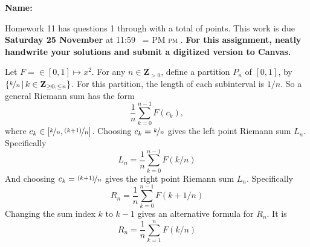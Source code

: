 \documentclass[12pt,fleqn,answers]{exam}
\makeatletter
\newcommand{\integers}{\mathbf{Z}}
\newcommand{\quiz}{11}
\newcommand{\term}{Fall}
\DeclareRobustCommand{\maybefakesc}[1]{%
  \ifnum\pdfstrcmp{\f@series}{\bfdefault}=\z@
    {\fontsize{\dimexpr0.8\dimexpr\f@size pt\relax}{0}\selectfont\uppercase{#1}}%
  \else
    \textsc{#1}%
  \fi
}
\newcommand\PM{\,\maybefakesc{pm}\xspace}
\makeatother
\begin{document}
\large
\vspace{0.1in}
\noindent{}
{\bf Name:}  \\
\noindent \makebox[3.0truein][l]{\textbf{Homework \quiz, \term \/ \the\year}}
\vspace{0.1in}

\noindent  Homework \quiz\/  has questions 1 through  \numquestions \/ with a total 
of  \numpoints\/  points. 
This work is due \textbf{Saturday 25 November} at 11:59 \PM.
\textbf{For this assignment, neatly handwrite your solutions and submit
a digitized version to Canvas.}

\vspace{0.1in}


\begin{questions}

 \question Let $F = \in [0,1] \mapsto x^2$. For any $n \in \integers_{>0}$,
 define a partition $P_n$ of $[0,1]$, by 
 $ \left \{\nicefrac{k}{n} \, | \, k \in \integers_{\geq 0, \leq n} \right \}$.
 For this partition, the length of each subinterval is $1/n$.
 So a general Riemann sum has the form
 \begin{equation*}
     \frac{1}{n }\sum_{k=0}^{n-1}  F(c_k),
 \end{equation*}
where $c_k \in [\nicefrac{k}{n},\nicefrac{(k+1)}{n} ]$.
Choosing $c_k = \nicefrac{k}{n}$ gives the left point Riemann sum 
$L_n$. Specifically
 \begin{equation*}
    L_n = \frac{1}{n} \sum_{k=0}^{n-1} F(k/n)
 \end{equation*}
 And choosing $c_k = \nicefrac{(k+1)}{n}$ gives the right point Riemann sum 
 $L_n$. Specifically
  \begin{equation*}
     R_n = \frac{1}{n} \sum_{k=0}^{n-1} F(k+1/n)
  \end{equation*}
Changing the sum index $k$ to $k-1$ gives an alternative
formula for $R_n$. It is
\begin{equation*}
    R_n = \frac{1}{n} \sum_{k=1}^{n} F(k/n)
 \end{equation*}


\end{questions}
\end{document}
